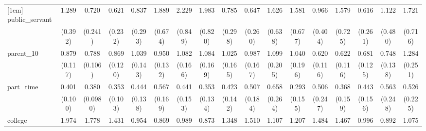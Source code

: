 {\begin{tabular}{l*{16}{c}}
[1em]
public\_servant      &       1.289         &       0.720         &       0.621         &       0.837         &       1.889         &       2.229\sym{*}  &       1.983         &       0.785         &       0.647         &       1.626         &       1.581         &       0.966         &       1.579         &       0.616         &       1.122         &       1.721         \\
                    &     (0.392)         &     (0.241)         &     (0.232)         &     (0.293)         &     (0.674)         &     (0.849)         &     (0.820)         &     (0.298)         &     (0.260)         &     (0.638)         &     (0.677)         &     (0.404)         &     (0.725)         &     (0.261)         &     (0.480)         &     (0.716)         \\
[1em]
parent\_10           &       0.879         &       0.788         &       0.869         &       1.039         &       0.950         &       1.082         &       1.084         &       1.025         &       0.987         &       1.099         &       1.040         &       0.620\sym{*}  &       0.622\sym{*}  &       0.681\sym{*}  &       0.748         &       1.284         \\
                    &     (0.117)         &     (0.106)         &     (0.120)         &     (0.143)         &     (0.132)         &     (0.166)         &     (0.169)         &     (0.165)         &     (0.167)         &     (0.205)         &     (0.196)         &     (0.116)         &     (0.116)         &     (0.125)         &     (0.138)         &     (0.251)         \\
[1em]
part\_time           &       0.401\sym{***}&       0.380\sym{***}&       0.353\sym{***}&       0.444\sym{**} &       0.567         &       0.441\sym{*}  &       0.353\sym{**} &       0.423\sym{*}  &       0.507         &       0.658         &       0.293\sym{*}  &       0.506         &       0.368\sym{*}  &       0.443\sym{*}  &       0.563         &       0.526         \\
                    &     (0.100)         &    (0.0980)         &     (0.103)         &     (0.138)         &     (0.169)         &     (0.153)         &     (0.134)         &     (0.142)         &     (0.184)         &     (0.264)         &     (0.155)         &     (0.247)         &     (0.159)         &     (0.156)         &     (0.248)         &     (0.225)         \\
[1em]
college             &       1.974\sym{***}&       1.778\sym{**} &       1.431         &       0.954         &       0.869         &       0.989         &       0.873         &       1.348         &       1.510         &       1.107         &       1.207         &       1.484         &       1.467         &       0.996         &       0.892         &       1.075         \\

\end{tabular}}
